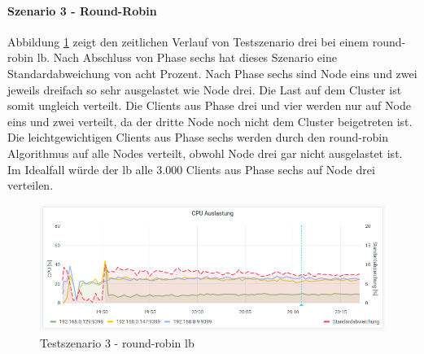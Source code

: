 \paragraph{Szenario 3 - Round-Robin}
Abbildung \ref{fig:s3-rr} zeigt den zeitlichen Verlauf von Testszenario drei bei einem round-robin \ac{lb}.
Nach Abschluss von Phase sechs hat dieses Szenario eine Standardabweichung von acht Prozent.
Nach Phase sechs sind Node eins und zwei jeweils dreifach so sehr ausgelastet wie Node drei. Die Last auf dem Cluster ist somit ungleich verteilt.
Die Clients aus Phase drei und vier werden nur auf Node eins und zwei verteilt, da der dritte Node noch nicht dem Cluster beigetreten ist. Die leichtgewichtigen Clients aus Phase sechs werden durch den round-robin Algorithmus auf alle Nodes verteilt, obwohl Node drei gar nicht ausgelastet ist. Im Idealfall würde der \ac{lb} alle 3.000 Clients aus Phase sechs auf Node drei verteilen.
\begin{figure}[h]
    \centering
    \includegraphics[scale=0.8]{images/s3_rr.png}
    \caption{Testszenario 3 - round-robin \acl{lb}}
    \label{fig:s3-rr}
\end{figure}

\newpage
